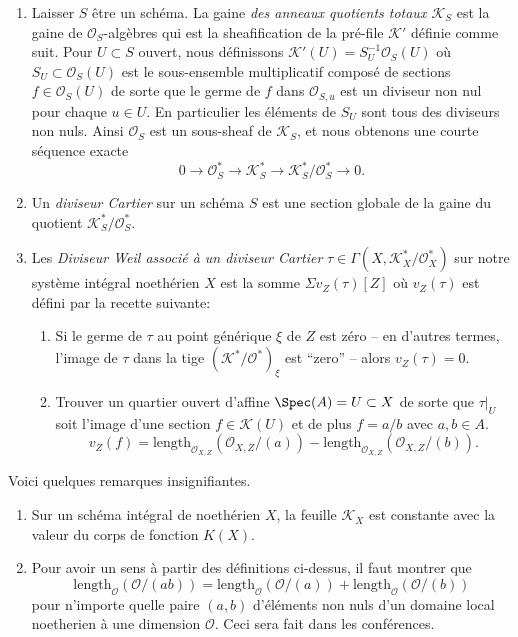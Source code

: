\begin{definition}
\begin{enumerate}
\begin{enumerate}
$$$$
où $f \in {\mathcal O}_{X, Z} = {\mathcal O}_{X, \xi}$ est le non-zérodiviseur qui
définit $D$ dans un quartier affine de $\xi$ (comme dans (4) ci-dessus).
\end{enumerate}
\item Laisser $S$ être un schéma. La gaine {\it des
anneaux quotients totaux ${\mathcal K}_S$} est la gaine de ${\mathcal O}_S$-algèbres qui est
la sheafification de la pré-file ${\mathcal K}'$ définie comme suit. Pour $U
\subset S$ ouvert, nous définissons ${\mathcal K}'(U) = S_U^{-1}{\mathcal O}_S(U)$ où $S_U \subset
{\mathcal O}_S(U)$ est le sous-ensemble multiplicatif composé de sections $f \in {\mathcal
O}_S(U)$ de sorte que le germe de $f$ dans ${\mathcal O}_{S,
u}$ est un diviseur non nul pour chaque $u\in U$. En particulier
les éléments de $S_U$ sont tous des diviseurs non nuls. Ainsi
${\mathcal O}_S$ est un sous-sheaf de ${\mathcal K}_S$, et nous obtenons une
courte séquence exacte
$$
0 \to {\mathcal O}_S^\ast \to {\mathcal K}_S^\ast \to
{\mathcal K}_S^\ast/{\mathcal O}_S^\ast \to 0.
$$
\item Un {\it diviseur Cartier} sur un schéma $S$
est une section globale de la gaine du quotient ${\mathcal K}_S^\ast/{\mathcal O}_S^\ast$.
\item Les {\it Diviseur Weil associé à un diviseur
Cartier} $\tau \in \Gamma(X, {\mathcal K}_X^\ast/{\mathcal O}_X^\ast)$ sur notre
système intégral noethérien $X$
est la somme $\Sigma v_Z(\tau)[Z]$ où $v_Z(\tau)$ est défini
par la recette suivante:
\begin{enumerate}
\item Si le germe de $\tau$ au point générique
$\xi$ de $Z$ est zéro -- en d'autres termes, l'image de
$\tau$ dans la tige $({\mathcal K}^\ast/{\mathcal O}^\ast)_\xi$ est ``zero'' -- alors $v_Z(\tau) = 0$.
\item Trouver un quartier ouvert d'affine $\Spec(A) = U \subset X$ de
sorte que $\tau|_U$ soit l'image d'une section $f \in {\mathcal K}(U)$ et
de plus $f = a/b$ avec $a, b \in A$.
$$
v_Z(f) = \text{length}_{{\mathcal O}_{X, Z}}({\mathcal O}_{X, Z}/(a)) -
\text{length}_{{\mathcal O}_{X, Z}}({\mathcal O}_{X, Z}/(b)).
$$
\end{enumerate}
\end{enumerate}
\end{definition}

\begin{remarks}
\label{remarks-divisors}
Voici quelques remarques insignifiantes.
\begin{enumerate}
\item Sur un schéma intégral de noethérien $X$,
la feuille ${\mathcal K}_X$ est constante avec la valeur du corps de fonction $K(X)$.
\item Pour avoir un sens à partir des définitions ci-dessus, il faut
montrer que
$$
\text{length}_{\mathcal O}({\mathcal O}/(ab)) =
\text{length}_{\mathcal O}({\mathcal O}/(a)) +
\text{length}_{\mathcal O}({\mathcal O}/(b))
$$
pour n'importe quelle paire $(a, b)$ d'éléments non nuls d'un domaine local noetherien
à une dimension ${\mathcal O}$. Ceci sera fait dans les conférences.
\end{enumerate}
\end{remarks}

